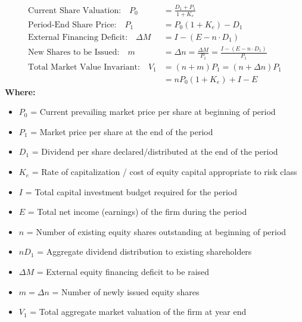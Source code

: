 \begin{formulabox}
\begin{align*}
    \text{Current Share Valuation:} \quad P_0 &= \frac{D_1 + P_1}{1 + K_e} \\[4pt]
    \text{Period-End Share Price:} \quad P_1 &= P_0 (1 + K_e) - D_1 \\[4pt]
    \text{External Financing Deficit:} \quad \Delta M &= I - (E - n \cdot D_1) \\[4pt]
    \text{New Shares to be Issued:} \quad m &= \Delta n = \frac{\Delta M}{P_1} = \frac{I - (E - n \cdot D_1)}{P_1} \\[4pt]
    \text{Total Market Value Invariant:} \quad V_1 &= (n + m) P_1 = (n + \Delta n) P_1 \\[4pt]
    &= n P_0 (1 + K_e) + I - E
\end{align*}
\textbf{Where:}
\begin{itemize}[noitemsep, topsep=2pt]
    \item $P_0$ = Current prevailing market price per share at beginning of period
    \item $P_1$ = Market price per share at the end of the period
    \item $D_1$ = Dividend per share declared/distributed at the end of the period
    \item $K_e$ = Rate of capitalization / cost of equity capital appropriate to risk class
    \item $I$ = Total capital investment budget required for the period
    \item $E$ = Total net income (earnings) of the firm during the period
    \item $n$ = Number of existing equity shares outstanding at beginning of period
    \item $n D_1$ = Aggregate dividend distribution to existing shareholders
    \item $\Delta M$ = External equity financing deficit to be raised
    \item $m = \Delta n$ = Number of newly issued equity shares
    \item $V_1$ = Total aggregate market valuation of the firm at year end
\end{itemize}
\end{formulabox}

